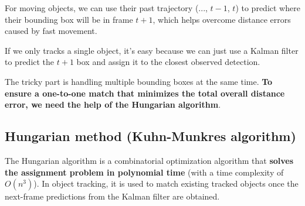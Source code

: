 \documentclass[10pt,twocolumn,letterpaper]{article}
\begin{document}
For moving objects, we can use their past trajectory (..., $t-1$, $t$) to predict where their bounding box will be in frame $t+1$, which helps overcome distance errors caused by fast movement.

If we only tracks a single object, it’s easy because we can just use a Kalman filter to predict the $t+1$ box and assign it to the closest observed detection.

The tricky part is handling multiple bounding boxes at the same time. \textbf{To ensure a one-to-one match that minimizes the total overall distance error, we need the help of the Hungarian algorithm}.
\subsection{Hungarian method (Kuhn-Munkres algorithm)}
The Hungarian algorithm is a combinatorial optimization algorithm that \textbf{solves the assignment problem in polynomial time} (with a time complexity of $O(n^3)$). In object tracking, it is used to match existing tracked objects once the next-frame predictions from the Kalman filter are obtained. 
\end{document}
